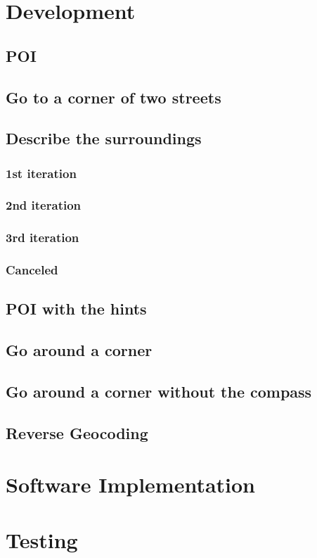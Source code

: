 \documentclass[11pt,oneside,a4paper]{book}
\begin{document}
	\chapter{Development}
		\section{POI}		
		\section{Go to a corner of two streets}		
		\section{Describe the surroundings}
			\subsection{1st iteration}		
			\subsection{2nd iteration}		
			\subsection{3rd iteration}		
			\subsection{Canceled}		
		\section{POI with the hints}
		\section{Go around a corner}
		\section{Go around a corner without the compass}
		\section{Reverse Geocoding}
		
		
				
	\chapter{Software Implementation}
	\chapter{Testing}
\end{document}
